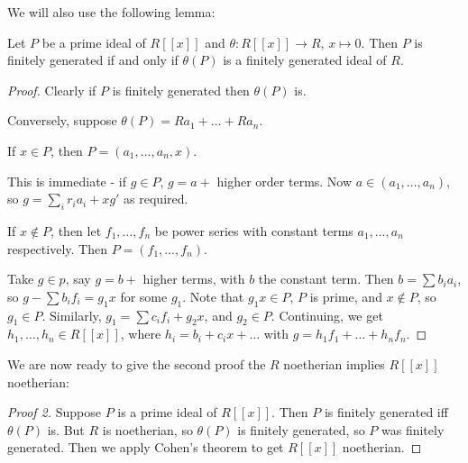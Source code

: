 \documentclass[10pt,a4paper]{article}
\begin{document}
We will also use the following lemma:
\begin{lemma}
  Let $P$ be a prime ideal of $R[[x]]$ and $\theta : R[[x]] \to R$, $x \mapsto 0$. Then $P$ is finitely generated if and only if $\theta(P)$ is a finitely generated ideal of $R$.
\end{lemma}
\begin{proof}
  Clearly if $P$ is finitely generated then $\theta(P)$ is.

  Conversely, suppose $\theta(P) = Ra_1 + \ldots + Ra_n$.

  If $x \in P$, then $P = (a_1, \ldots, a_n, x)$.

  This is immediate - if $g \in P$, $g = a + $ higher order terms. Now $a \in (a_1, \ldots, a_n)$, so $g = \sum_i r_i a_i + xg'$ as required.

  If $x \notin P$, then let $f_1, \ldots, f_n$ be power series with constant terms $a_1, \ldots, a_n$ respectively. Then $P = (f_1, \ldots, f_n)$.

  Take $g \in p$, say $g = b +$ higher terms, with $b$ the constant term. Then $b = \sum b_i a_i$, so $g - \sum b_i f_i = g_1 x$ for some $g_1$. Note that $g_1 x \in P$, $P$ is prime, and $x \notin P$, so $g_1 \in P$. Similarly, $g_1 = \sum c_i f_i + g_2 x$, and $g_2 \in P$. Continuing, we get $h_1, \ldots, h_n \in R[[x]]$, where $h_i = b_i + c_i x + \ldots$ with $g = h_1f_1 + \ldots + h_nf_n$.
\end{proof}

We are now ready to give the second proof the $R$ noetherian implies $R[[x]]$ noetherian:
\begin{proof}[Proof 2]
  Suppose $P$ is a prime ideal of $R[[x]]$. Then $P$ is finitely generated iff $\theta(P)$ is. But $R$ is noetherian, so $\theta(P)$ is finitely generated, so $P$ was finitely generated. Then we apply Cohen's theorem to get $R[[x]]$ noetherian.
\end{proof}
\end{document}
